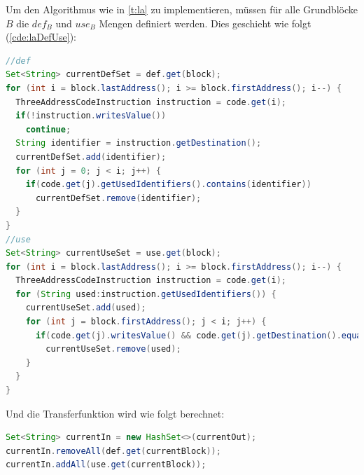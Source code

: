 \newpage
Um den Algorithmus wie in \cref{t:la} zu implementieren, müssen für alle
Grundblöcke $B$ die $def_B$ und $use_B$ Mengen definiert werden.
Dies geschieht wie folgt (\cref{cde:laDefUse}):
\begin{lstlisting}[language=Java, caption={Berechnung der $def$ und $use$-Mengen}, label={cde:laDefUse}]
//def
Set<String> currentDefSet = def.get(block);
for (int i = block.lastAddress(); i >= block.firstAddress(); i--) {
  ThreeAddressCodeInstruction instruction = code.get(i);
  if(!instruction.writesValue())
    continue;
  String identifier = instruction.getDestination();
  currentDefSet.add(identifier);
  for (int j = 0; j < i; j++) {
    if(code.get(j).getUsedIdentifiers().contains(identifier))
      currentDefSet.remove(identifier);
  }
}
//use
Set<String> currentUseSet = use.get(block);
for (int i = block.lastAddress(); i >= block.firstAddress(); i--) {
  ThreeAddressCodeInstruction instruction = code.get(i);
  for (String used:instruction.getUsedIdentifiers()) {
    currentUseSet.add(used);
    for (int j = block.firstAddress(); j < i; j++) {
      if(code.get(j).writesValue() && code.get(j).getDestination().equals(used))
        currentUseSet.remove(used);
    }
  }
}
\end{lstlisting}
Und die Transferfunktion wird wie folgt berechnet:

\begin{lstlisting}[language=Java, caption={Berechnung der $out$-Menge}, label={cde:laOut}]
Set<String> currentIn = new HashSet<>(currentOut);
currentIn.removeAll(def.get(currentBlock));
currentIn.addAll(use.get(currentBlock));
\end{lstlisting}

\newpage
